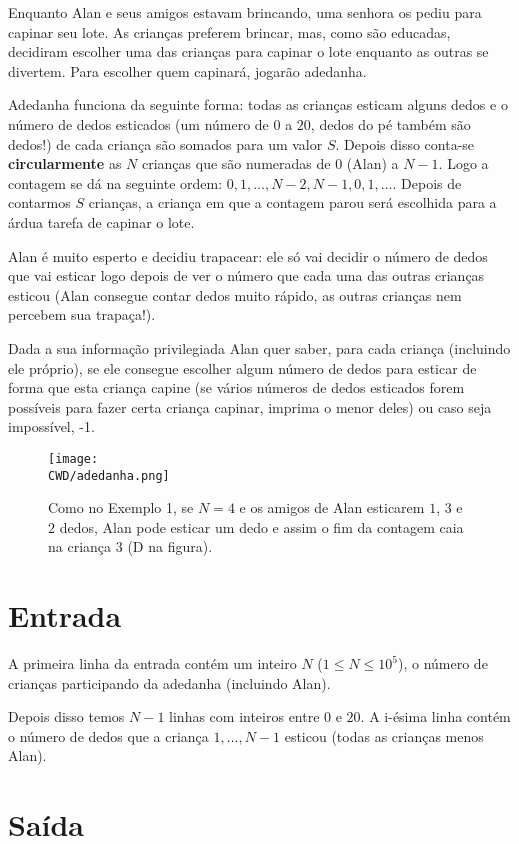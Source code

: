 Enquanto Alan e seus amigos estavam brincando, uma senhora os pediu para capinar seu lote. As crianças preferem brincar, mas, como são educadas, decidiram escolher uma das crianças para capinar o lote enquanto as outras se divertem. Para escolher quem capinará, jogarão adedanha.

Adedanha funciona da seguinte forma: todas as crianças esticam alguns dedos e o número de dedos esticados (um número de $0$ a $20$, dedos do pé também são dedos!) de cada criança são somados para um valor $S$. Depois disso conta-se \textbf{circularmente} as $N$ crianças que são numeradas de $0$ (Alan) a $N - 1$. Logo a contagem se dá na seguinte ordem: $0, 1, \ldots, N - 2, N - 1, 0, 1, \ldots$. Depois de contarmos $S$ crianças, a criança em que a contagem parou será escolhida para a árdua tarefa de capinar o lote.

Alan é muito esperto e decidiu trapacear: ele só vai decidir o número de dedos que vai esticar logo depois de ver o número que cada uma das outras crianças esticou (Alan consegue contar dedos muito rápido, as outras crianças nem percebem sua trapaça!).

Dada a sua informação privilegiada Alan quer saber, para cada criança (incluindo ele próprio), se ele consegue escolher algum número de dedos para esticar de forma que esta criança capine (se vários números de dedos esticados forem possíveis para fazer certa criança capinar, imprima o menor deles) ou caso seja impossível, -1.

\begin{figure}[H]
    \centering
    \texttt{[image: \\CWD/adedanha.png]}
    \caption{Como no Exemplo 1, se $N = 4$ e os amigos de Alan esticarem $1$, $3$ e $2$ dedos, Alan pode esticar um dedo e assim o fim da contagem caia na criança $3$ (D na figura).}
\end{figure}

\section*{Entrada}

A primeira linha da entrada contém um inteiro $N$ ($1 \leq N \leq 10^5$), o número de crianças participando da adedanha (incluindo Alan).

Depois disso temos $N - 1$ linhas com inteiros entre $0$ e $20$. A i-ésima linha contém o número de dedos que a criança $1,\ldots,N - 1$ esticou (todas as crianças menos Alan). 

\section*{Saída}

